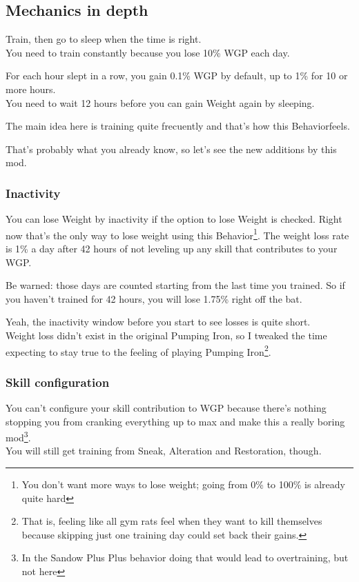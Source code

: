 \documentclass[11pt]{article}
\newcommand{\w}{Weight}
\newcommand{\W}{WGP}
\newcommand{\B}{Behavior}
\newcommand{\PI}{Pumping Iron}
\begin{document}
\subsection{Mechanics in depth}
Train, then go to sleep when the time is right. \\
You need to train constantly because you lose 10\% \W{} each day.

For each hour slept in a row, you gain 0.1\% \W{} by default, up to 1\% for 10 or more hours.\\
You need to wait 12 hours before you can gain \w{} again by sleeping.

The main idea here is training quite frecuently and that's how this \B feels.

That's probably what you already know, so let's see the new additions by this mod.

\subsubsection{Inactivity}
You can lose \w{} by inactivity if the option to lose \w{} is checked. Right now that's the only way to lose weight using this \B\footnote{You don't want more ways to lose weight; going from 0\% to 100\% is already quite hard}.
The weight loss rate is 1\% a day after 42 hours of not leveling up any skill that contributes to your \W.

Be warned: those days are counted starting from the last time you trained. So if you haven't trained for 42 hours, you will lose 1.75\% right off the bat.

Yeah, the inactivity window before you start to see losses is quite short.\\
Weight loss didn't exist in the original \PI, so I tweaked the time expecting to stay true to the feeling of playing \PI{}\footnote{That is, feeling like all gym rats feel when they want to kill themselves because skipping just one training day could set back their gains.}.

\subsubsection{Skill configuration}
You can't configure your skill contribution to \W{} because there's nothing stopping you from cranking everything up to max and make this a really boring mod\footnote{In the Sandow Plus Plus behavior doing that would lead to overtraining, but not here}.\\
You will still get training from Sneak, Alteration and Restoration, though.
\end{document}
